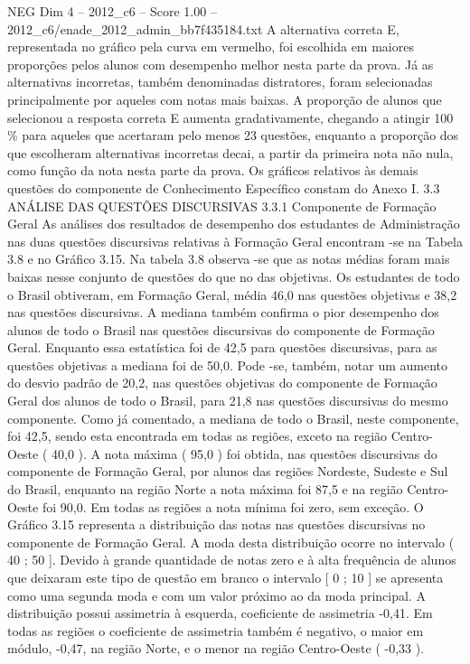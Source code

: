 \begin{textsample}{NEG Dim 4 – 2012\_c6 – Score 1.00 – 2012\_c6/enade\_2012\_admin\_bb7f435184.txt}
A alternativa correta E, representada no gráfico pela curva em vermelho, foi escolhida em maiores proporções pelos alunos com desempenho melhor nesta parte da prova.
Já as alternativas incorretas, também denominadas distratores, foram selecionadas principalmente por aqueles com notas mais baixas.
A proporção de alunos que selecionou a resposta correta E aumenta gradativamente, chegando a atingir 100 \% para aqueles que acertaram pelo menos 23 questões, enquanto a proporção dos que escolheram alternativas incorretas decai, a partir da primeira nota não nula, como função da nota nesta parte da prova.
Os gráficos relativos às demais questões do componente de Conhecimento Específico constam do Anexo I. 3.3 ANÁLISE DAS QUESTÕES DISCURSIVAS 3.3.1 Componente de Formação Geral As análises dos resultados de desempenho dos estudantes de Administração nas duas questões discursivas relativas à Formação Geral encontram -se na Tabela 3.8 e no Gráfico 3.15.
Na tabela 3.8 observa -se que as notas médias foram mais baixas nesse conjunto de questões do que no das objetivas.
Os estudantes de todo o Brasil obtiveram, em Formação Geral, média 46,0 nas questões objetivas e 38,2 nas questões discursivas.
A mediana também confirma o pior desempenho dos alunos de todo o Brasil nas questões discursivas do componente de Formação Geral.
Enquanto essa estatística foi de 42,5 para questões discursivas, para as questões objetivas a mediana foi de 50,0.
Pode -se, também, notar um aumento do desvio padrão de 20,2, nas questões objetivas do componente de Formação Geral dos alunos de todo o Brasil, para 21,8 nas questões discursivas do mesmo componente.
Como já comentado, a mediana de todo o Brasil, neste componente, foi 42,5, sendo esta encontrada em todas as regiões, exceto na região Centro-Oeste ( 40,0 ).
A nota máxima ( 95,0 ) foi obtida, nas questões discursivas do componente de Formação Geral, por alunos das regiões Nordeste, Sudeste e Sul do Brasil, enquanto na região Norte a nota máxima foi 87,5 e na região Centro-Oeste foi 90,0.
Em todas as regiões a nota mínima foi zero, sem exceção.
O Gráfico 3.15 representa a distribuição das notas nas questões discursivas no componente de Formação Geral.
A moda desta distribuição ocorre no intervalo ( 40 ; 50 ].
Devido à grande quantidade de notas zero e à alta frequência de alunos que deixaram este tipo de questão em branco o intervalo [ 0 ; 10 ] se apresenta como uma segunda moda e com um valor próximo ao da moda principal.
A distribuição possui assimetria à esquerda, coeficiente de assimetria -0,41.
Em todas as regiões o coeficiente de assimetria também é negativo, o maior em módulo, -0,47, na região Norte, e o menor na região Centro-Oeste ( -0,33 ).

\end{textsample}
